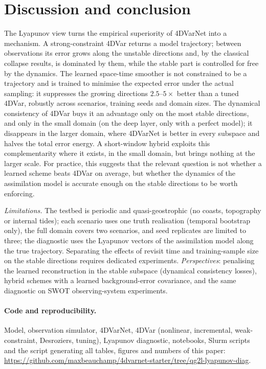 \documentclass[10pt,a4paper]{article}
\newcommand{\code}{\url{https://github.com/maxbeauchamp/4dvarnet-starter/tree/qg2l-lyapunov-diag}}
\begin{document}
\begin{table}[t]\centering\small
\caption{Model integrations over a 90-day test period (+ 30-day spin-up), small domain. 4DVarNet needs none at
inference (one forward pass of the network per window).}\label{tab:cost}

\end{table}

\section{Discussion and conclusion}
The Lyapunov view turns the empirical superiority of 4DVarNet into a mechanism. A strong-constraint 4DVar returns a
model trajectory; between observations its error grows along the unstable directions and, by the classical collapse
results, is dominated by them, while the stable part is controlled for free by the dynamics. The learned
space-time smoother is not constrained to be a trajectory and is trained to minimise the expected error under the
actual sampling: it suppresses the growing directions $2.5$--$5\times$ better than a tuned 4DVar, robustly across
scenarios, training seeds and domain sizes. The dynamical consistency of 4DVar buys it an advantage only on the most
stable directions, and only in the small domain (on the deep layer, only with a perfect model); it disappears in the
larger domain, where 4DVarNet is better in every subspace and halves the total error energy. A short-window hybrid
exploits this complementarity where it exists, in the small domain, but brings nothing at the larger scale. For
practice, this suggests that the relevant question is not whether a learned scheme beats 4DVar on average, but whether
the dynamics of the assimilation model is accurate enough on the stable directions to be worth enforcing.

\emph{Limitations.} The testbed is periodic and quasi-geostrophic (no coasts, topography or internal tides); each
scenario uses one truth realisation (temporal bootstrap only), the full domain covers two scenarios, and seed
replicates are limited to three; the diagnostic uses the Lyapunov vectors of the assimilation model along the true
trajectory. Separating the effects of revisit time and training-sample size on the stable directions requires
dedicated experiments. \emph{Perspectives}: penalising the learned reconstruction in the stable subspace (dynamical
consistency losses), hybrid schemes with a learned background-error covariance, and the same diagnostic on SWOT
observing-system experiments.

\paragraph{Code and reproducibility.} Model, observation simulator, 4DVarNet, 4DVar (nonlinear, incremental,
weak-constraint, Desroziers, tuning), Lyapunov diagnostic, notebooks, Slurm scripts and the script generating all
tables, figures and numbers of this paper: \code.



\end{document}
